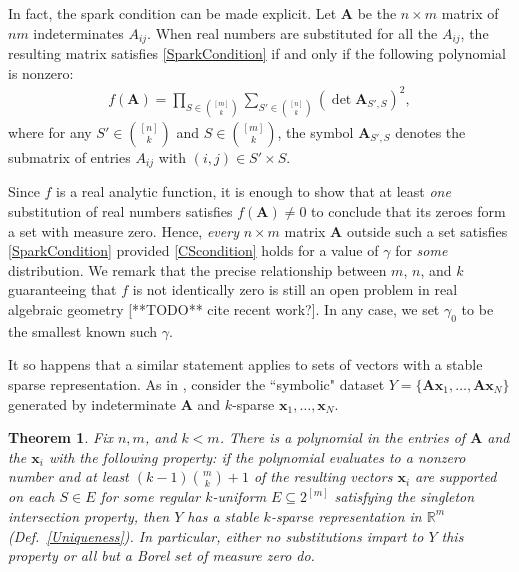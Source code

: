 \documentclass[9pt,twocolumn]{pnas-new}
\newtheorem{theorem}{Theorem}
\begin{document}
In fact, the spark condition can be made explicit.  Let $\mathbf{A}$  be the $n \times m$ matrix of $nm$ indeterminates $A_{ij}$. When real numbers are substituted for all the $A_{ij}$, the resulting matrix satisfies \eqref{SparkCondition} if and only if the following polynomial is nonzero:
\begin{align*}
f(\mathbf{A}) = \prod_{S \in {[m] \choose k}} \sum_{S' \in {[n] \choose k}} (\det \mathbf{A}_{S',S})^2,
\end{align*}
%
where for any $S' \in {[n] \choose k}$ and $S \in {[m] \choose k}$, the symbol $\mathbf{A}_{S',S}$ denotes the submatrix of entries $A_{ij}$ with $(i,j) \in S' \times S$. 

Since $f$ is a real analytic function, it is enough to show that at least \emph{one} substitution of real numbers satisfies $f(\mathbf{A}) \neq 0$ to conclude that its zeroes form a set with measure zero. Hence, \emph{every} $n \times m$ matrix $\mathbf{A}$ outside such a set satisfies \eqref{SparkCondition} provided \eqref{CScondition} holds for a value of $\gamma$ for \emph{some} distribution. We remark that the precise relationship between $m$, $n$, and $k$ guaranteeing that $f$ is not identically zero is still an open problem in real algebraic geometry [**TODO** cite recent work?]. In any case, we set $\gamma_0$ to be the smallest known such $\gamma$.

It so happens that a similar statement applies to sets of vectors with a stable sparse representation. As in \cite[Sec.~IV]{Hillar15}, consider the ``symbolic" dataset $Y = \{\mathbf{A}\mathbf{x}_1,\ldots,\mathbf{A} \mathbf{x}_N\}$ generated by indeterminate $\mathbf{A}$ and $k$-sparse $\mathbf{x}_1, \ldots, \mathbf{x}_N$. 

\begin{theorem}\label{robustPolythm} %
Fix $n, m$, and $k < m$. There is a polynomial in the entries of $\mathbf{A}$ and the $\mathbf{x}_i$ with the following property:  if the polynomial evaluates to a nonzero number and at least \mbox{$(k-1){m \choose k}+1$} of the resulting vectors $\mathbf{x}_i$ are supported on each $S \in E$ for some regular $k$-uniform $E \subseteq 2^{[m]}$ satisfying the singleton intersection property, then $Y$ has a stable $k$-sparse representation in $\mathbb{R}^m$ (Def.~\ref{Uniqueness}). In particular, either no substitutions impart to $Y$ this property or all but a Borel set of measure zero do. 
\end{theorem}

\end{document}
